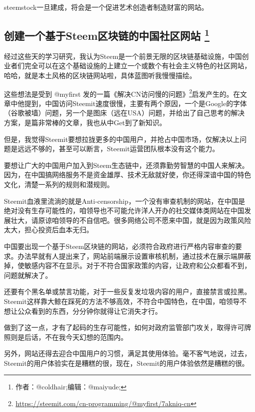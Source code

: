 \documentclass[]{ctexbook}
\renewcommand{\href}[2]{#2\footnote{\url{#1}}}
\begin{document}
steemstock一旦建成，将会是一个促进艺术创造者制造财富的网站。

\hypertarget{dev-cn-community}{%
\subsection[创建一个基于Steem区块链的中国社区网站 ]{\texorpdfstring{创建一个基于Steem区块链的中国社区网站 \footnote{作者：@coldhair;编辑：@maiyude;}}{创建一个基于Steem区块链的中国社区网站 }}\label{dev-cn-community}}

经过这些天的学习研究，我认为Steem是一个前景无限的区块链基础设施，中国创业者们完全可以在这个基础设施的上建立一个或数个有社会主义特色的社区网站，哈哈，就是本土风格的区块链网站啦，具体蓝图听我慢慢描绘。

这些想法是受到 @myfirst 发的一篇\href{https://steemit.com/cn-programming/@myfirst/7akniq-cn}{《解决CN访问慢的问题》}启发产生的。在文章中他提到，中国访问Steemit速度很慢，主要有两个原因，一个是Google的字体（谷歌被墙）问题，另一个是图床（远在USA）问题，并给出了自己思考的解决方案，是篇非常棒的文章，我也从中Get到了新知识。

但是，我觉得Steemit要想拉拢更多的中国用户，并抢占中国市场，仅解决以上问题是远远不够的，甚至可以断言，Steemit运营团队根本没有这个能力。

要想让广大的中国用户加入到Steem生态链中，还须靠勤劳智慧的中国人来解决。因为，在中国搞网络服务不是资金雄厚、技术无敌就好使，你还得深谙中国的特色文化，清楚一系列的规则和潜规则。

Steemit血液里流淌的就是Anti-censorship，一个没有审查机制的网站，在中国是绝对没有生存可能性的，咱领导也不可能允许洋人开办的社交媒体类网站在中国发展壮大，请原谅咱领导的不自信吧。很多网络公司不愿来中国，就是因为政策风险太大，担心投资后血本无归。

中国要出现一个基于Steem区块链的网站，必须符合政府进行严格内容审查的要求。办法早就有人提出来了，网站前端展示设置审核机制，通过技术在展示端屏蔽掉，使敏感内容不在显示。对于不符合国家政策的内容，让政府和公众都看不到，问题就解决了。

还要有个黑名单或禁言功能，对于一些反复发垃圾内容的用户，直接禁言或拉黑。Steemit这样靠大鲸在踩死的方法不够高效，不符合中国特色，在中国，咱领导不想让公众看到的东西，分分钟你就得让它消失才行。

做到了这一点，才有了起码的生存可能性，如何对政府监管部门攻关，取得许可牌照则是后话，不在我今天幻想的范围内。

另外，网站还得去迎合中国用户的习惯，满足其使用体验。毫不客气地说，过去，Steemit的用户体验实在是糟糕的很，现在，Steemit的用户体验依然是糟糕的很。
\end{document}
